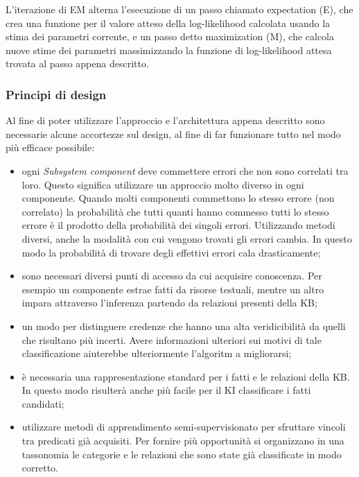 \begin{info}[Algoritmo EM]
L'iterazione di EM alterna l'esecuzione di un passo chiamato expectation (E), che crea una funzione per il valore atteso della log-likelihood calcolata usando la stima dei parametri corrente, e un passo detto maximization (M), che calcola nuove stime dei parametri massimizzando la funzione di log-likelihood attesa trovata al passo appena descritto\cite{AlgoritmEM:online}.
\end{info}

\subsubsection{Principi di design}
Al fine di poter utilizzare l'approccio e l'architettura appena descritto sono necessarie alcune accortezze sul design, al fine di far funzionare tutto nel modo più efficace possibile:
\begin{itemize}
    \item ogni \textit{Subsystem component} deve commettere errori che non sono correlati tra loro. Questo significa utilizzare un approccio molto diverso in ogni componente. Quando molti componenti commettono lo stesso errore (non correlato) la probabilità che tutti quanti hanno commesso tutti lo stesso errore è il prodotto della probabilità dei singoli errori. Utilizzando metodi diversi, anche la modalità con cui vengono trovati gli errori cambia. In questo modo la probabilità di trovare degli effettivi errori cala drasticamente;
    \item sono necessari diversi punti di accesso da cui acquisire conoscenza. Per esempio un componente estrae fatti da risorse testuali, mentre un altro impara attraverso l'inferenza partendo da relazioni presenti della KB;
    \item un modo per distinguere credenze che hanno una alta veridicibilità da quelli che risultano più incerti. Avere informazioni ulteriori sui motivi di tale classificazione aiuterebbe ulteriormente l'algoritm a migliorarsi;
    \item è necessaria una rappresentazione standard per i fatti e le relazioni della KB. In questo modo risulterà anche più facile per il KI classificare i fatti candidati;
    \item utilizzare metodi di apprendimento semi-supervisionato per sfruttare vincoli tra predicati già acquisiti. Per fornire più opportunità si organizzano in una tassonomia le categorie e le relazioni che sono state già classificate in modo corretto\cite{AlgoritmEM:online}.
\end{itemize}
\newpage